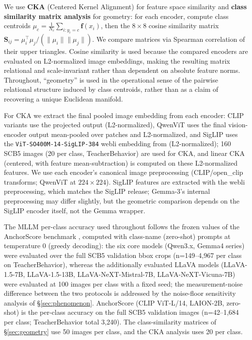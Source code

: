 \documentclass[a4paper,fleqn]{cas-sc}
\begin{document}
We use \textbf{CKA} (Centered Kernel Alignment) \cite{kornblith2019similarity} for feature space similarity and \textbf{class similarity matrix analysis} for geometry: for each encoder, compute class centroids $\mu_c = \frac{1}{N_c}\sum_{i: y_i=c} \mathbf{f}(x_i)$, then the $8\times8$ cosine similarity matrix $\mathbf{S}_{ij} = \mu_i^\top \mu_j / (\|\mu_i\|\|\mu_j\|)$. We compare matrices via Spearman correlation of their upper triangles. Cosine similarity is used because the compared encoders are evaluated on L2-normalized image embeddings, making the resulting matrix relational and scale-invariant rather than dependent on absolute feature norms. Throughout, ``geometry'' is used in the operational sense of the pairwise relational structure induced by class centroids, rather than as a claim of recovering a unique Euclidean manifold.

 For CKA we extract the final pooled image embedding from each encoder: CLIP variants use the projected  output (L2-normalized), QwenViT uses the final vision-encoder output mean-pooled over patches and L2-normalized, and SigLIP \cite{zhai2023sigmoid} uses the \texttt{ViT-SO400M-14-SigLIP-384} webli embedding from  (L2-normalized); 160 SCB5 images (20 per class, TeacherBehavior) are used for CKA, and linear CKA (centered, with feature mean-subtraction) is computed on these L2-normalized features. We use each encoder's canonical image preprocessing (CLIP/open\_clip transforms; QwenViT at $224\times224$). SigLIP features are extracted with the  webli preprocessing, which matches the SigLIP release; Gemma-3's internal preprocessing may differ slightly, but the geometric comparison depends on the SigLIP encoder itself, not the Gemma wrapper.

 The MLLM per-class accuracy used throughout follows the frozen values of the AnchorScore benchmark \cite{ma2025anchorscore}, computed with class-name (zero-shot) prompts at temperature 0 (greedy decoding): the six core models (Qwen3.x, Gemma4 series) were evaluated over the full SCB5 validation bbox crops (n=149--4{,}967 per class on TeacherBehavior), whereas the additionally evaluated LLaVA models (LLaVA-1.5-7B, LLaVA-1.5-13B, LLaVA-NeXT-Mistral-7B, LLaVA-NeXT-Vicuna-7B) were evaluated at 100 images per class with a fixed seed; the measurement-noise difference between the two protocols is addressed by the noise-floor sensitivity analysis of \S\ref{sec:phenomenon}. AnchorScore (CLIP ViT-L/14, LAION-2B, zero-shot) is the per-class accuracy on the full SCB5 validation images (n=42--1{,}684 per class; TeacherBehavior total 3{,}240). The class-similarity matrices of \S\ref{sec:geometry} use 50 images per class, and the CKA analysis uses 20 per class.
\end{document}
